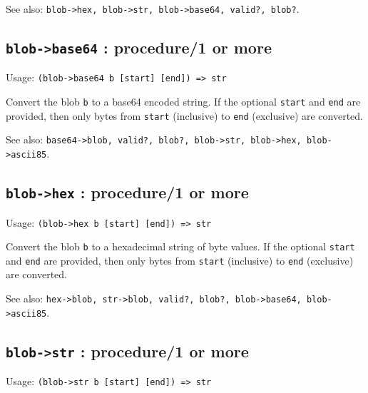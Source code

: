 \documentclass[
]{article}
\newcommand{\passthrough}[1]{#1}
\begin{document}
See also:
\passthrough{\lstinline!blob->hex, blob->str, blob->base64, valid?, blob?!}.

\hypertarget{blob-base64-procedure1-or-more-1}{%
\subsection{\texorpdfstring{\texttt{blob-\textgreater{}base64} :
procedure/1 or
more}{blob-\textgreater base64 : procedure/1 or more}}\label{blob-base64-procedure1-or-more-1}}

Usage: \passthrough{\lstinline!(blob->base64 b [start] [end]) => str!}

Convert the blob \passthrough{\lstinline!b!} to a base64 encoded string.
If the optional \passthrough{\lstinline!start!} and
\passthrough{\lstinline!end!} are provided, then only bytes from
\passthrough{\lstinline!start!} (inclusive) to
\passthrough{\lstinline!end!} (exclusive) are converted.

See also:
\passthrough{\lstinline!base64->blob, valid?, blob?, blob->str, blob->hex, blob->ascii85!}.

\hypertarget{blob-hex-procedure1-or-more-1}{%
\subsection{\texorpdfstring{\texttt{blob-\textgreater{}hex} :
procedure/1 or
more}{blob-\textgreater hex : procedure/1 or more}}\label{blob-hex-procedure1-or-more-1}}

Usage: \passthrough{\lstinline!(blob->hex b [start] [end]) => str!}

Convert the blob \passthrough{\lstinline!b!} to a hexadecimal string of
byte values. If the optional \passthrough{\lstinline!start!} and
\passthrough{\lstinline!end!} are provided, then only bytes from
\passthrough{\lstinline!start!} (inclusive) to
\passthrough{\lstinline!end!} (exclusive) are converted.

See also:
\passthrough{\lstinline!hex->blob, str->blob, valid?, blob?, blob->base64, blob->ascii85!}.

\hypertarget{blob-str-procedure1-or-more-1}{%
\subsection{\texorpdfstring{\texttt{blob-\textgreater{}str} :
procedure/1 or
more}{blob-\textgreater str : procedure/1 or more}}\label{blob-str-procedure1-or-more-1}}

Usage: \passthrough{\lstinline!(blob->str b [start] [end]) => str!}
\end{document}
